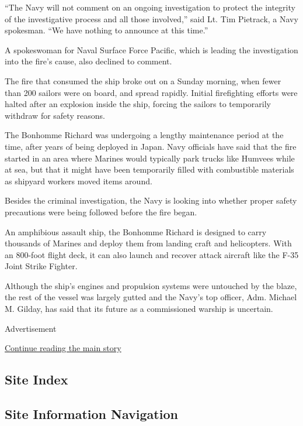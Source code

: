 ``The Navy will not comment on an ongoing investigation to protect the
integrity of the investigative process and all those involved,'' said
Lt. Tim Pietrack, a Navy spokesman. ``We have nothing to announce at
this time.''

A spokeswoman for Naval Surface Force Pacific, which is leading the
investigation into the fire's cause, also declined to comment.

The fire that consumed the ship broke out on a Sunday morning, when
fewer than 200 sailors were on board, and spread rapidly. Initial
firefighting efforts were halted after an explosion inside the ship,
forcing the sailors to temporarily withdraw for safety reasons.

The Bonhomme Richard was undergoing a lengthy maintenance period at the
time, after years of being deployed in Japan. Navy officials have said
that the fire started in an area where Marines would typically park
trucks like Humvees while at sea, but that it might have been
temporarily filled with combustible materials as shipyard workers moved
items around.

Besides the criminal investigation, the Navy is looking into whether
proper safety precautions were being followed before the fire began.

An amphibious assault ship, the Bonhomme Richard is designed to carry
thousands of Marines and deploy them from landing craft and helicopters.
With an 800-foot flight deck, it can also launch and recover attack
aircraft like the F-35 Joint Strike Fighter.

Although the ship's engines and propulsion systems were untouched by the
blaze, the rest of the vessel was largely gutted and the Navy's top
officer, Adm. Michael M. Gilday, has said that its future as a
commissioned warship is uncertain.

Advertisement

\protect\hyperlink{after-bottom}{Continue reading the main story}

\hypertarget{site-index}{%
\subsection{Site Index}\label{site-index}}

\hypertarget{site-information-navigation}{%
\subsection{Site Information
Navigation}\label{site-information-navigation}}

